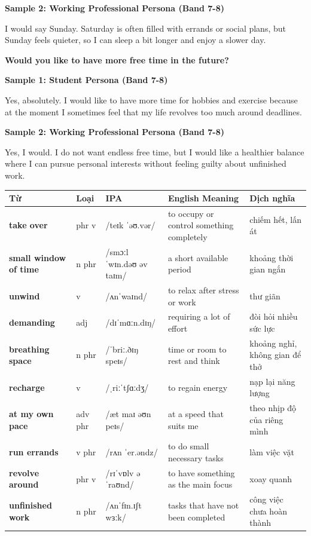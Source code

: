 \textbf{Sample 2: Working Professional Persona (Band 7-8)}

I would say Sunday. Saturday is often filled with errands or social plans, but Sunday feels quieter, so I can sleep a bit longer and enjoy a slower day.

\separator

\begin{ieltsquestion}
\textbf{Would you like to have more free time in the future?}
\end{ieltsquestion}
\textbf{Sample 1: Student Persona (Band 7-8)}

Yes, absolutely. I would like to have more time for hobbies and exercise because at the moment I sometimes feel that my life revolves too much around deadlines.

\textbf{Sample 2: Working Professional Persona (Band 7-8)}

Yes, I would. I do not want endless free time, but I would like a healthier balance where I can pursue personal interests without feeling guilty about unfinished work.

\separator


\vspace{0.8em}
\begin{center}
\renewcommand{\arraystretch}{1.65}
\begin{tabularx}{\textwidth}{|V{0.22\textwidth}|C{0.07\textwidth}|I{0.20\textwidth}|Y|V{0.18\textwidth}|}
\hline
{}
\textbf{Từ} & \textbf{Loại} & \textbf{IPA} & \textbf{English Meaning} & \textbf{Dịch nghĩa} \\
\hline
\textbf{take over} & phr v & /teɪk ˈəʊ.vər/ & to occupy or control something completely & chiếm hết, lấn át \\ \hline
\textbf{small window of time} & n phr & /smɔːl ˈwɪn.dəʊ əv taɪm/ & a short available period & khoảng thời gian ngắn \\ \hline
\textbf{unwind} & v & /ʌnˈwaɪnd/ & to relax after stress or work & thư giãn \\ \hline
\textbf{demanding} & adj & /dɪˈmɑːn.dɪŋ/ & requiring a lot of effort & đòi hỏi nhiều sức lực \\ \hline
\textbf{breathing space} & n phr & /ˈbriː.ðɪŋ speɪs/ & time or room to rest and think & khoảng nghỉ, không gian để thở \\ \hline
\textbf{recharge} & v & /ˌriːˈtʃɑːdʒ/ & to regain energy & nạp lại năng lượng \\ \hline
\textbf{at my own pace} & adv phr & /æt maɪ əʊn peɪs/ & at a speed that suits me & theo nhịp độ của riêng mình \\ \hline
\textbf{run errands} & v phr & /rʌn ˈer.əndz/ & to do small necessary tasks & làm việc vặt \\ \hline
\textbf{revolve around} & phr v & /rɪˈvɒlv əˈraʊnd/ & to have something as the main focus & xoay quanh \\ \hline
\textbf{unfinished work} & n phr & /ʌnˈfɪn.ɪʃt wɜːk/ & tasks that have not been completed & công việc chưa hoàn thành \\ \hline
\end{tabularx}
\end{center}

